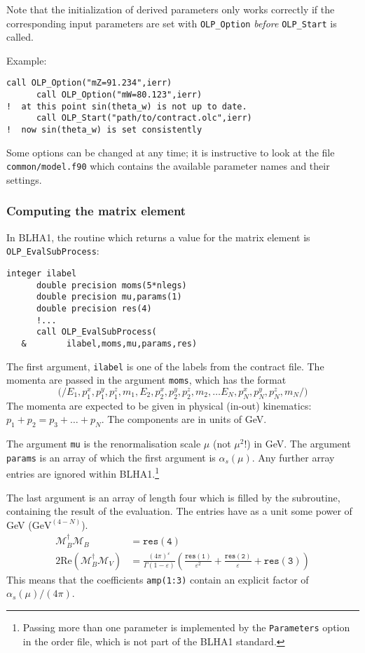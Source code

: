 Note that the initialization of derived parameters only works correctly
if the corresponding input parameters are set with \texttt{OLP\_Option}
\emph{before} \texttt{OLP\_Start} is called.

Example:
\begin{lstlisting}[style=fortran]
      call OLP_Option("mZ=91.234",ierr)
      call OLP_Option("mW=80.123",ierr)
!  at this point sin(theta_w) is not up to date.
      call OLP_Start("path/to/contract.olc",ierr)
!  now sin(theta_w) is set consistently
\end{lstlisting}

Some options can be changed at any time; it is instructive to 
look at the file
\texttt{common/model.f90} which contains  the available
parameter names and  their settings.

\subsubsection{Computing the matrix element}

In BLHA1, the routine which returns a value for the matrix element is
\texttt{OLP\_EvalSubProcess}:
\begin{lstlisting}[style=fortran]
      integer ilabel
      double precision moms(5*nlegs)
      double precision mu,params(1)
      double precision res(4)
      !...
      call OLP_EvalSubProcess(
   &        ilabel,moms,mu,params,res)
\end{lstlisting}

The first argument, \texttt{ilabel} is one of the labels from the
contract file. The momenta are passed in the argument \texttt{moms},
which has the format
\begin{displaymath}
\mathtt{(/}
E_1, p^x_1, p^y_1, p^z_1, m_1,
E_2, p^x_2, p^y_2, p^z_2, m_2, \ldots
E_N, p^x_N, p^y_N, p^z_N, m_N
\mathtt{/)}
\end{displaymath}
The momenta are expected to be given in physical (in-out) 
kinematics: $p_1+p_2=p_3+\ldots+p_N$.
The components are in units of GeV.

The argument \texttt{mu} is the renormalisation scale $\mu$ (not $\mu^2$!)
in GeV. The argument \texttt{ params} is an array of which the first argument is
$\alpha_s(\mu)$. Any further array entries are ignored within BLHA1.\footnote{
Passing more than one parameter is implemented by the \texttt{Parameters}
option in the order file, which is  not part of the BLHA1 standard.}

The last argument is an array of length four which is filled by the subroutine, 
containing the result of the evaluation. The entries have as a unit some
power of GeV ($\mathrm{GeV}^{(4-N)}$).
\begin{align}
\label{eq:res}
\mathcal{M}_B^\dagger\mathcal{M}_B&=\mathtt{res(4)}\nonumber\\
2\mathrm{Re}\left(\mathcal{M}_B^\dagger\mathcal{M}_V\right)&=
\frac{(4\pi)^\varepsilon}{\Gamma(1-\varepsilon)}\left(
\frac{\mathtt{res(1)}}{\varepsilon^2}
+\frac{\mathtt{res(2)}}{\varepsilon}
+\mathtt{res(3)}
\right)
\end{align}
This means that the coefficients \texttt{amp(1:3)} contain
an explicit factor of $\alpha_s(\mu)/(4\pi)$.

